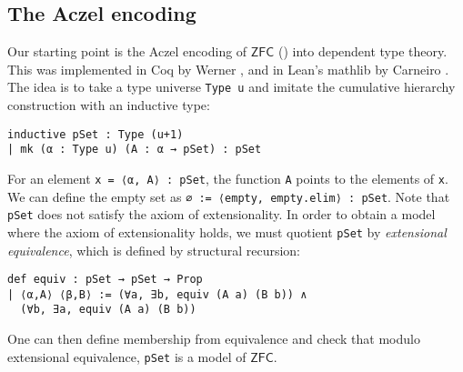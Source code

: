 \documentclass[sigplan,10pt,review, anonymous]{acmart}
\newcommand{\lil}{\lstinline}
\newcommand{\ZFC}{\mathsf{ZFC}}
\theoremstyle{definition}
\begin{document}
\subsection{The Aczel encoding}
\label{subsect:bset:aczel}
Our starting point is the Aczel encoding of \(\ZFC\) (\cite{aczel1978type, aczel1986type, aczel1982type}) into dependent type theory.
This was implemented in Coq by Werner \cite{werner1997sets}, and in Lean's \textsf{mathlib} by Carneiro \cite{mario1}.
The idea is to take a type universe \lstinline{Type u} and imitate the cumulative hierarchy construction with an inductive type:
\begin{lstlisting}
inductive pSet : Type (u+1)
| mk (α : Type u) (A : α → pSet) : pSet
\end{lstlisting}
For an element \lil{x = ⟨α, A⟩ : pSet}, the function \lil{A} points to the elements of \lil{x}.
We can define the empty set as \lstinline{∅ := ⟨empty, empty.elim⟩ : pSet}.
Note that \lil{pSet} does not satisfy the axiom of extensionality.
In order to obtain a model where the axiom of extensionality holds, we must quotient \lstinline{pSet} by \emph{extensional equivalence}, which is defined by structural recursion: %
\begin{lstlisting}
def equiv : pSet → pSet → Prop
| ⟨α,A⟩ ⟨β,B⟩ := (∀a, ∃b, equiv (A a) (B b)) ∧
  (∀b, ∃a, equiv (A a) (B b))
\end{lstlisting}
One can then define membership from equivalence and check that modulo extensional equivalence, \lstinline{pSet} is a model of \(\ZFC\).

\end{document}
